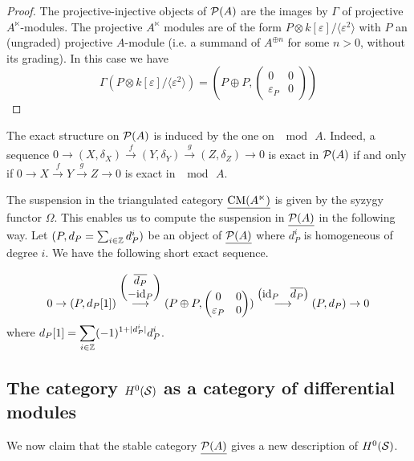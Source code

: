 \documentclass[12pt]{article}
\begin{document}
	\begin{proof}
		The projective-injective objects of ${\cal{P}}(A)$ are the images by $\Gamma$ of projective $A^\ltimes$-modules. The projective $A^\ltimes$ modules are of the form $P \otimes k[\varepsilon]/\langle \varepsilon^2 \rangle$ with $P$ an (ungraded) projective $A$-module (i.e. a summand of $A^{\oplus n}$ for some $n>0$, without its grading). In this case we have 
		\[\Gamma(P \otimes k[\varepsilon]/\langle \varepsilon^2 \rangle) = (P\oplus P, \begin{pmatrix}
			0 & 0 \\
			\varepsilon_P & 0
		\end{pmatrix})\]
	\end{proof}
	
	\begin{remark}
		\label{exactstr}
		The exact structure on ${\cal{P}}(A)$ is induced by the one on $\mod \, A$. Indeed, a sequence $0 \to (X,\delta_X) \overset{f}{\to} (Y,\delta_Y) \overset{g}{\to} (Z,\delta_Z) \to 0$ is exact in ${\cal{P}}(A)$ if and only if $0 \to X \overset{f}{\to} Y \overset{g}{\to} Z \to 0$ is exact in $\mod \, A$.
	\end{remark}
	
	\begin{remark}
		\label{susp}
		The suspension in the triangulated category $\underline{\textup{CM}(A^\ltimes)}$ is given by the syzygy functor $\Omega$. This enables us to compute the suspension in $\underline{{\cal{P}}(A)}$ in the following way. Let $(P,d_P = \sum_{i \in \mathbb{Z}} d_P^i)$ be an object of $\underline{{\cal{P}}(A)}$ where $d_P^i$ is homogeneous of degree $i$. We have the following short exact sequence.
		
		\[0 \to (P,d_P[1]) \overset{\begin{pmatrix}
				\overline{d_P} \\
				-\textup{id}_P
		\end{pmatrix}}{\longrightarrow} (P \oplus P, \begin{pmatrix}
			0 & 0 \\
			\varepsilon_P & 0
		\end{pmatrix}) \overset{\begin{pmatrix}
			\textup{id}_P & \overline{d_P}
			\end{pmatrix}}{\longrightarrow} (P, d_P) \to0 \]
		where $d_P[1] = \displaystyle\sum_{i \in \mathbb{Z}} (-1)^{1 + |d_P^i|} d_P^i$.
	\end{remark}
	
	\subsection{The category $H^0({\cal{S}})$ as a category of differential modules}
	We now claim that the stable category $\underline{{\cal{P}}(A)}$ gives a new description of $H^0({\cal{S}})$. 
	
\end{document}
